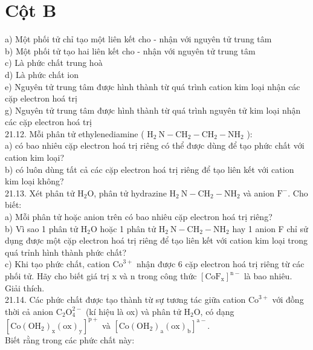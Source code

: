 \documentclass[10pt]{article}
\begin{document}
\section*{Cột B}
a) Một phối tử chỉ tạo một liên kết cho - nhận với nguyên tử trung tâm\\
b) Một phối tử tạo hai liên kết cho - nhận với nguyên tử trung tâm\\
c) Là phức chất trung hoà\\
d) Là phức chất ion\\
e) Nguyên tử trung tâm được hình thành từ quá trình cation kim loại nhận các cặp electron hoá trị\\
g) Nguyên tử trung tâm được hình thành từ quá trình nguyên tử kim loại nhận các cặp electron hoá trị\\
21.12. Mỗi phân tử ethylenediamine ( $\mathrm{H}_{2} \mathrm{~N}-\mathrm{CH}_{2}-\mathrm{CH}_{2}-\mathrm{NH}_{2}$ ):\\
a) có bao nhiêu cặp electron hoá trị riêng có thể được dùng để tạo phức chất với cation kim loại?\\
b) có luôn dùng tất cả các cặp electron hoá trị riêng để tạo liên kết với cation kim loại không?\\
21.13. Xét phân tử $\mathrm{H}_{2} \mathrm{O}$, phân tử hydrazine $\mathrm{H}_{2} \mathrm{~N}-\mathrm{CH}_{2}-\mathrm{NH}_{2}$ và anion $\mathrm{F}^{-}$. Cho biết:\\
a) Mỗi phân tử hoặc anion trên có bao nhiêu cặp electron hoá trị riêng?\\
b) Vì sao 1 phân tử $\mathrm{H}_{2} \mathrm{O}$ hoặc 1 phân tử $\mathrm{H}_{2} \mathrm{~N}-\mathrm{CH}_{2}-\mathrm{NH}_{2}$ hay 1 anion F chỉ sử dụng được một cặp electron hoá trị riêng để tạo liên kết với cation kim loại trong quá trỉnh hình thành phức chất?\\
c) Khi tạo phức chất, cation $\mathrm{Co}^{3+}$ nhận được 6 cặp electron hoá trị riêng từ các phối tử. Hãy cho biết giá trị x và n trong công thức $\left[\mathrm{CoF}_{\mathrm{x}}\right]^{\mathrm{n}-}$ là bao nhiêu. Giải thích.\\
21.14. Các phức chất được tạo thành từ sự tương tác giữa cation $\mathrm{Co}^{3+}$ với đồng thời cả anion $\mathrm{C}_{2} \mathrm{O}_{4}^{2-}$ (kí hiệu là ox) và phân tử $\mathrm{H}_{2} \mathrm{O}$, có dạng $\left[\mathrm{Co}\left(\mathrm{OH}_{2}\right)_{\mathrm{x}}(\mathrm{ox})_{\mathrm{y}}\right]^{\mathrm{p}+}$ và $\left[\mathrm{Co}\left(\mathrm{OH}_{2}\right)_{\mathrm{a}}(\mathrm{ox})_{\mathrm{b}}\right]^{\mathrm{a}-}$.\\
Biết rằng trong các phức chất này:
\end{document}
